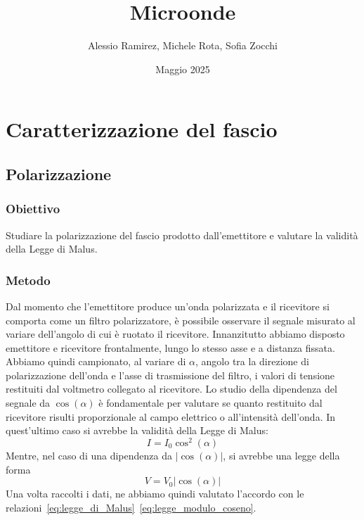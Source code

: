 \documentclass[a4paper]{article}
\title{Microonde}
\author{Alessio Ramirez, Michele Rota, Sofia Zocchi}
\date{Maggio 2025} %
\begin{document}
\maketitle
\section{Caratterizzazione del fascio}
\subsection{Polarizzazione}
\subsubsection{Obiettivo}
Studiare la polarizzazione del fascio prodotto dall'emettitore e valutare la validità della Legge di Malus.

\subsubsection{Metodo}
Dal momento che l'emettitore produce un'onda polarizzata e il ricevitore si comporta come un filtro polarizzatore, è possibile osservare il segnale misurato al variare dell'angolo di cui è ruotato il ricevitore. Innanzitutto abbiamo disposto emettitore e ricevitore frontalmente, lungo lo stesso asse e a distanza fissata. Abbiamo quindi campionato, al variare di $\alpha$, angolo tra la direzione di polarizzazione dell'onda e l'asse di trasmissione del filtro, i valori di tensione restituiti dal voltmetro collegato al ricevitore. Lo studio della dipendenza del segnale da $\cos(\alpha)$ è fondamentale per valutare se quanto restituito dal ricevitore risulti proporzionale al campo elettrico o all'intensità dell'onda. In quest'ultimo caso si avrebbe la validità della Legge di Malus:
\begin{equation}
I = I_0 \cos^2(\alpha)
\label{eq:legge_di_Malus}
\end{equation}
Mentre, nel caso di una dipendenza da $|\cos(\alpha)|$, si avrebbe una legge della forma
\begin{equation}
V = V_0|\cos(\alpha)|
\label{eq:legge_modulo_coseno}
\end{equation}
Una volta raccolti i dati, ne abbiamo quindi valutato l'accordo con le relazioni~\eqref{eq:legge_di_Malus}~\eqref{eq:legge_modulo_coseno}.
\end{document}
